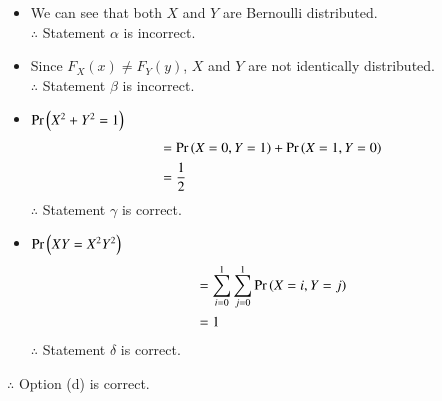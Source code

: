 \documentclass[journal,12pt,twocolumn]{IEEEtran}
\begin{document}
\begin{itemize}
    \item We can see that both $X$ and $Y$ are Bernoulli distributed.\\
    $\therefore$ Statement $\alpha$ is incorrect.\\
    \item Since $F_X(x)\neq F_Y(y)$, $X$ and $Y$ are not identically distributed.\\
    $\therefore$ Statement $\beta$ is incorrect.\\
    \item $\Pr\left(X^2+Y^2=1\right)$
    \begin{align}
        &=\Pr\left(X=0,Y=1\right)+\Pr\left(X=1,Y=0\right)\nonumber\\
        &= \frac{1}{2}
    \end{align}
    $\therefore$ Statement $\gamma$ is correct.\\
    \item $\Pr\left(XY=X^2Y^2\right)$
    \begin{align}
        &=\sum_{i=0}^1\sum_{j=0}^1\Pr\left(X=i,Y=j\right)\nonumber\\
        &= 1
    \end{align}
    $\therefore$ Statement $\delta$ is correct.\\
\end{itemize}

$\therefore$ Option (d) is correct.
\end{document}
